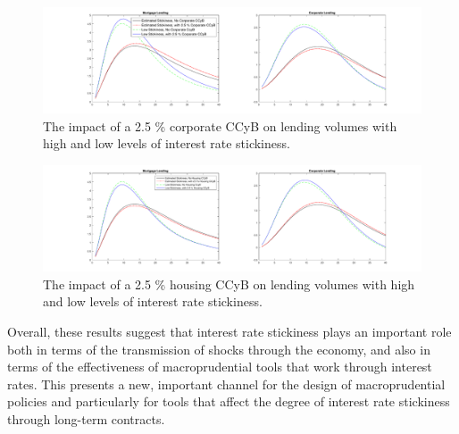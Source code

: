 \documentclass[12pt]{article}
\numberwithin{equation}{section}
\begin{document}
\begin{figure}[H]
\centering
\caption{The impact of a 2.5 \% corporate CCyB on lending volumes with high and low levels of interest rate stickiness. }
\label{irf_stickiness_corporateCCyB}
\includegraphics[scale=0.35]{stickiness_corporate_ccybECAB.pdf}
\end{figure}

\begin{figure}[H]
\centering
\caption{The impact of a 2.5 \% housing CCyB on lending volumes with high and low levels of interest rate stickiness.}
\label{irf_stickiness_housingCCyB}
\includegraphics[scale=0.35]{stickiness_housing_ccybECAB.pdf}
\end{figure}


Overall, these results suggest that interest rate stickiness plays an important role both in terms of the transmission of shocks through the economy, and also in terms of the effectiveness of macroprudential tools that work through interest rates. This presents a new, important channel for the design of macroprudential policies and particularly for tools that affect the degree of interest rate stickiness through long-term contracts. 
\end{document}
